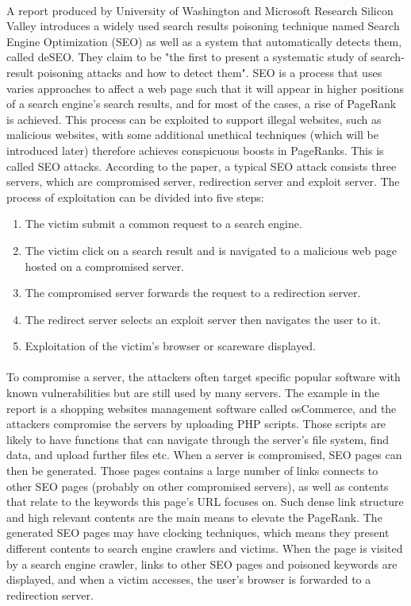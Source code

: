 \paragraph{}
A report produced by University of Washington and Microsoft
Research Silicon Valley introduces a widely used search results poisoning
technique named Search Engine Optimization (SEO) as well as a system that
automatically detects them, called deSEO.\cite{deseo} They claim to be "the
first to present a systematic study of search-result poisoning attacks and how
to detect them". SEO is a process that uses varies approaches to affect a web
page such that it will appear in higher positions of a search engine's search
results, and for most of the cases, a rise of PageRank is achieved. This
process can be exploited to support illegal websites, such as malicious
websites, with some additional unethical techniques (which will be introduced
later) therefore achieves conspicuous boosts in PageRanks. This is called SEO
attacks. According to the paper, a typical SEO attack consists three servers,
which are compromised server, redirection server and exploit server. The
process of exploitation can be divided into five steps: 
\begin{enumerate} 
\item The victim submit a common request to a search engine.
\item The victim click on a search result and is navigated to a malicious web
page hosted on a compromised server.
\item The compromised server forwards the request to a redirection server.
\item The redirect server selects an exploit server then navigates the user
to it. 
\item Exploitation of the victim's browser or scareware displayed. 
\end{enumerate}
\paragraph{}
To compromise a server, the attackers often target specific popular software
with known vulnerabilities but are still used by many servers. The example in
the report is a shopping websites management software called osCommerce, and
the attackers compromise the servers by uploading PHP scripts. Those scripts
are likely to have functions that can navigate through the server's file system,
find data, and upload further files etc. When a server is compromised, SEO
pages can then be generated. Those pages contains a large number of links
connects to other SEO pages (probably on other compromised servers), as well as
contents that relate to the keywords this page's URL focuses on. Such dense
link structure and high relevant contents are the main means to elevate the
PageRank. The generated SEO pages may have clocking techniques, which means
they present different contents to search engine crawlers and victims. When the
page is visited by a search engine crawler, links to other SEO pages and
poisoned keywords are displayed, and when a victim accesses, the user's browser
is forwarded to a redirection server. 
